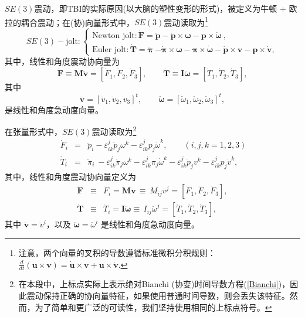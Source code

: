 \documentclass[11pt,fontset=founder]{ctexart}
\begin{document}
$SE(3)$震动，即TBI的实际原因(以大脑的塑性变形的形式)，被定义为牛顿 + 欧拉的耦合震动；在(协)向量形式中，$SE(3)$震动读取为\footnote{%
注意，两个向量的叉积的导数遵循标准微积分积规则： $\frac{d}{dt}(\mathbf{u\times v})=\dot{\mathbf{u}}\times \mathbf{v}+\mathbf{u}\times \dot{\mathbf{v}}.$}
\begin{equation*}
SE(3)-\text{jolt}:\left\{
\begin{array}{l}
\text{Newton~jolt}:\boldsymbol{\dot{\mathbf F}=\ddot{\mathbf p}-\dot{\mathbf p}\times \omega -\mathbf p\times
\dot{\omega}}~,\qquad \\
\text{Euler~jolt}:\boldsymbol{\dot{\mathbf T}=\ddot{\pi}}~\boldsymbol{-\dot{\pi}\times
\omega -\pi \times \dot{\omega}-\dot{\mathbf p}\times \mathbf v-\mathbf p\times \dot{\mathbf v}},
\end{array}
\right.
\end{equation*}
其中，线性和角度震动协向量为
\begin{equation*}
\boldsymbol{\dot{\mathbf F}\equiv \mathbf M\ddot{\mathbf v}}=[\dot{F}_{{1}},\dot{F}_{{2}},\dot{F}_{{3}%
}],\qquad \boldsymbol{\dot{\mathbf T}\equiv \mathbf I\ddot{\omega}}=[\dot{T}_{{1}},\dot{T}_{{2}},%
\dot{T}_{{3}}],
\end{equation*}
其中
\begin{equation*}
\boldsymbol{\ddot{\mathbf v}}=[\ddot{v}_{{1}},\ddot{v}_{{2}},\ddot{v}_{{3}}]^{t},\qquad
\boldsymbol{\ddot{\omega}}=[\ddot{\omega}_{{1}},\ddot{\omega}_{{2}},\ddot{\omega}%
_{{3}}]^{t},
\end{equation*}
是线性和角度急动度向量。

在张量形式中，$SE(3)$震动读取为\footnote{%
在本段中，上标点实际上表示绝对Bianchi (协变)时间导数方程(\ref{Bianchi})，因此震动保持正确的协向量特征，如果使用普通时间导数，则会丢失该特征。然而，为了简单和更广泛的可读性，我们坚持使用相同的上标点符号。}
\begin{eqnarray*}
~\dot{F}_{i} &=&\ddot{p}_{i}-\varepsilon _{ik}^{j}\dot{p}_{j}{\omega }%
^{k}-\varepsilon _{ik}^{j}p_{j}{\dot{\omega}}^{k}, \qquad(i,j,k=1,2,3) \\
~\dot{T}_{{i}} &=&\ddot{\pi}_{i}~-\varepsilon _{ik}^{j}\dot{\pi}_{j}\omega
^{k}-\varepsilon _{ik}^{j}\pi _{j}{\dot{\omega}}^{k}-\varepsilon _{ik}^{j}%
\dot{p}_{j}v^{k}-\varepsilon _{ik}^{j}p_{j}\dot{v}^{k},
\end{eqnarray*}
其中，线性和角度震动协向量定义为
\begin{eqnarray*}
\boldsymbol{\dot{\mathbf F}} &\equiv &\dot{F}_{i}=\boldsymbol{\mathbf M\ddot{\mathbf v}}\,\equiv \mathbf{\,}%
M_{ij}\ddot{v}^{j}=[\dot{F}_{1},\dot{F}_{2},\dot{F}_{3}], \\
\boldsymbol{\dot{\mathbf T}} &\equiv &\dot{T}_{{i}}=\boldsymbol{\mathbf I\ddot{\omega}\equiv \,}%
I_{ij}\ddot{\omega}^{j}=[\dot{T}_{{1}},\dot{T}_{{2}},\dot{T}_{{3}}],
\end{eqnarray*}
其中 $\mathbf{\ddot{v}}=\ddot{v}^{{i}}$，以及 $\mathbf{\ddot{\omega}}=%
\ddot{\omega}^{{i}}$ 是线性和角度急动度向量。
\end{document}

